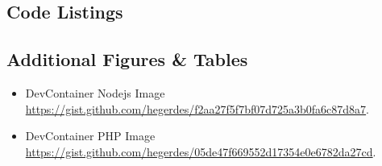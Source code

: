 \documentclass[12pt, a4paper]{article}
\begin{document}

\newpage

\singlespacing{}
\renewcommand{\thesubsection}{\Alph{subsection}}
\setcounter{page}{\value{lastroman}}



\newpage

\vspace*{\fill}
\vspace*{\fill}



\subsection{Code Listings}


\newpage

\subsection{Additional Figures \& Tables}


\newpage

\listoffigures
\listoftables
\lstlistoflistings{}
\vspace{-0.5cm}
\begin{itemize}
    \item DevContainer Nodejs Image  \\ \href{https://gist.github.com/hegerdes/f2aa27f5f7bf07d725a3b0fa6c87d8a7}{https://gist.github.com/hegerdes/f2aa27f5f7bf07d725a3b0fa6c87d8a7}.
    \item DevContainer PHP Image  \\ \href{https://gist.github.com/hegerdes/05de47f669552d17354e0e6782da27cd}{https://gist.github.com/hegerdes/05de47f669552d17354e0e6782da27cd}.
\end{itemize}

\newpage


% 
\end{document}
